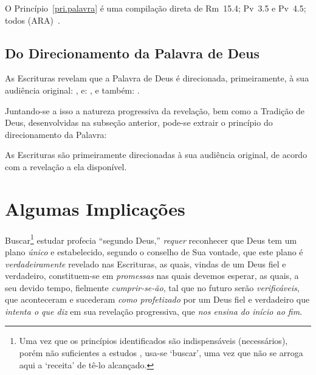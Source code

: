     O Princípio~\ref{pri.palavra} é uma compilação direta de Rm~15.4; Pv~3.5 e Pv~4.5; todos (ARA)~\cite{ARA}.


    \subsection{Do Direcionamento da Palavra de Deus}

    As Escrituras revelam que a Palavra de Deus é direcionada, primeiramente, à sua audiência original: , e: ,  e  também:  .

    Juntando-se a isso a natureza progressiva da revelação, bem como a Tradição de Deus, desenvolvidas na subseção anterior,
    pode-se extrair o princípio do direcionamento da Palavra:

    \begin{PRI}
        \label{pri.direcionam}
        As Escrituras são primeiramente direcionadas à sua audiência original, de  acordo  com  a  revelação  a  ela
        disponível.
    \end{PRI}




\section{Algumas Implicações}

    Buscar\footnote{Uma vez que os princípios identificados são indispensáveis (necessários), porém não  suficientes  a  estudos
    , usa-se `buscar', uma vez que não se arroga aqui a `receita' de  tê-lo  alcançado.}  estudar  profecia
    ``segundo Deus,'' \emph{requer} reconhecer que Deus tem um plano \emph{único} e estabelecido,  segundo  o  conselho  de  Sua
    vontade, que este plano é \emph{verdadeiramente} revelado nas Escrituras, as quais, vindas de um  Deus  fiel  e  verdadeiro,
    constituem-se em \emph{promessas} nas quais devemos esperar, as quais, a seu devido tempo,  fielmente  \emph{cumprir-se-ão},
    tal que no futuro serão \emph{verificáveis}, que aconteceram  e  sucederam  \emph{como  profetizado}  por  um  Deus  fiel  e
    verdadeiro que \emph{intenta o que diz} em sua revelação progressiva, que \emph{nos ensina do início ao fim}.

